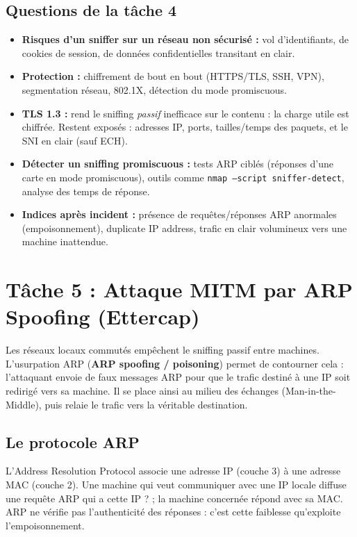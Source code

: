 \documentclass[11pt,a4paper]{article}
\begin{document}
\subsection{Questions de la tâche 4}
\begin{itemize}[leftmargin=1.4em]
  \item \textbf{Risques d'un sniffer sur un réseau non sécurisé :} vol d'identifiants, de
        cookies de session, de données confidentielles transitant en clair.
  \item \textbf{Protection :} chiffrement de bout en bout (HTTPS/TLS, SSH, VPN), segmentation
        réseau, 802.1X, détection du mode promiscuous.
  \item \textbf{TLS 1.3 :} rend le sniffing \emph{passif} inefficace sur le contenu : la
        charge utile est chiffrée. Restent exposés : adresses IP, ports, tailles/temps des
        paquets, et le SNI en clair (sauf ECH).
  \item \textbf{Détecter un sniffing promiscuous :} tests ARP ciblés (réponses d'une carte en
        mode promiscuous), outils comme \texttt{nmap --script sniffer-detect}, analyse des
        temps de réponse.
  \item \textbf{Indices après incident :} présence de requêtes/réponses ARP anormales
        (empoisonnement), \og{}duplicate IP address\fg{}, trafic en clair volumineux vers une
        machine inattendue.
\end{itemize}

\section{Tâche 5 : Attaque MITM par ARP Spoofing (Ettercap)}
Les réseaux locaux commutés empêchent le sniffing passif entre machines. L'usurpation ARP
(\textbf{ARP spoofing / poisoning}) permet de contourner cela : l'attaquant envoie de faux
messages ARP pour que le trafic destiné à une IP soit redirigé vers sa machine. Il se place
ainsi \og{}au milieu\fg{} des échanges (Man-in-the-Middle), puis relaie le trafic vers la
véritable destination.

\subsection{Le protocole ARP}
L'Address Resolution Protocol associe une adresse IP (couche 3) à une adresse MAC (couche
2). Une machine qui veut communiquer avec une IP locale diffuse une requête ARP \og{}qui a
cette IP ?\fg{} ; la machine concernée répond avec sa MAC. ARP ne vérifie pas l'authenticité
des réponses : c'est cette faiblesse qu'exploite l'empoisonnement.
\end{document}
